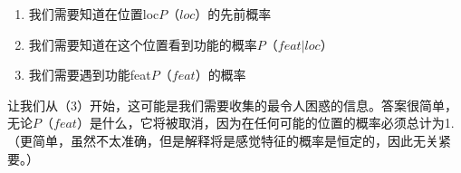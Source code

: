 \begin{enumerate}

\item 我们需要知道在位置loc$P（loc）$的先前概率
\item 我们需要知道在这个位置看到功能的概率$P（feat|loc）$
\item 我们需要遇到功能feat$P（feat）$的概率
\end{enumerate}





让我们从（3）开始，这可能是我们需要收集的最令人困惑的信息。答案很简单，无论$P（feat）$是什么，它将被取消，因为在任何可能的位置的概率必须总计为1.（更简单，虽然不太准确，但是解释将是感觉特征的概率是恒定的，因此无关紧要。）

